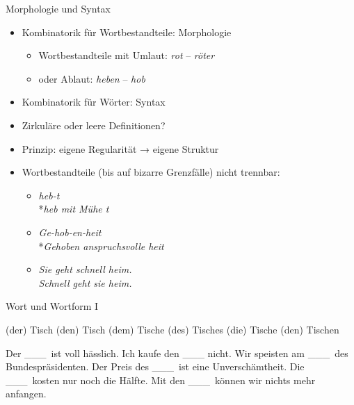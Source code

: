 \begin{frame}
  {Morphologie und Syntax}
  \pause
  \begin{itemize}[<+->]
    \item Kombinatorik für \alert{Wortbestandteile}: Morphologie
      \begin{itemize}[<+->]
        \item Wortbestandteile \zB mit \alert{Umlaut}: \textit{rot} -- \textit{röter}
        \item oder \alert{Ablaut}: \textit{heben} -- \textit{hob}
      \end{itemize}
    \item Kombinatorik für \alert{Wörter}: Syntax
      \Zeile
    \item \alert{Zirkuläre oder leere Definitionen?}
    \item {} Prinzip: eigene Regularität → eigene Struktur
      \Zeile
    \item Wortbestandteile (bis auf bizarre Grenzfälle) \alert{nicht trennbar}:
      \begin{itemize}
        \item \textit{heb-t}\\
          *\textit{heb mit Mühe t}
        \item \textit{Ge-hob-en-heit} \\
          *\textit{Gehoben anspruchsvolle heit}
        \item \textit{Sie geht schnell heim.}\\
          \textit{Schnell geht sie heim.}
      \end{itemize}
  \end{itemize}
\end{frame}

\begin{frame}
  {Wort und Wortform I}
  \pause
  \begin{exe}
    \ex
    \begin{xlist}
      \ex (der) Tisch
      \pause
      \ex (den) Tisch
      \pause
      \ex (dem) Tisch\alert{e}
      \pause
      \ex (des) Tisch\alert{es}
      \pause
      \ex (die) Tisch\alert{e}
      \pause
      \ex (den) Tisch\alert{en}
    \end{xlist}
  \end{exe}
  \pause
  \begin{exe}
    \ex
    \begin{xlist}
      \ex Der \_\_\_\ ist voll hässlich.
      \pause
      \ex Ich kaufe den \_\_\_ nicht.
      \pause
      \ex Wir speisten am \_\_\_\ des Bundespräsidenten.
      \pause
      \ex Der Preis des \_\_\_\ ist eine Unverschämtheit.
      \pause
      \ex Die \_\_\_\ kosten nur noch die Hälfte.
      \pause
      \ex Mit den \_\_\_\ können wir nichts mehr anfangen.
    \end{xlist}
  \end{exe}
\end{frame}

